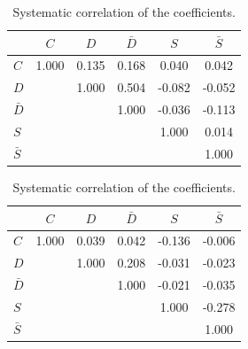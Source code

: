 \begin{table}[h]
\centering
\caption{Statistical correlation of the \CP coefficients.}
	\renewcommand{\arraystretch}{1}
\begin{tabular}{l | c c c c c } 
\hline
\hline
 & $C$ & $D$ & $\bar D$ & $S$ & $\bar S$  \\ 
\hline
$C$ &  1.000 & 0.135 & 0.168 & 0.040 & 0.042 \\
$D$ &  & 1.000 & 0.504 & -0.082 &  -0.052 \\
$\bar{D}$ &  & &  1.000 &  -0.036 & -0.113  \\
$S$ &  &&& 1.000 & 0.014 \\
$\bar{S}$ & &&&& 1.000 \\
\hline
\hline
\end{tabular}
\label{tab:statCorr}
%
%
\caption{Systematic correlation of the \CP coefficients.}
	\renewcommand{\arraystretch}{1}
\begin{tabular}{l | c c c c c } 
\hline
\hline
 & $C$ & $D$ & $\bar D$ & $S$ & $\bar S$  \\ 
\hline
$C$ &  1.000  &  0.039  &  0.042  &   -0.136   &    -0.006 \\
$D$ &  & 1.000 &  0.208    & -0.031  &   -0.023 \\
$\bar{D}$ &  & &  1.000 &  -0.021  &   -0.035  \\
$S$ &  &&& 1.000 &  -0.278 \\
$\bar{S}$ & &&&& 1.000 \\
\hline
\hline
\end{tabular}
\label{tab:systCorr}
\end{table}


